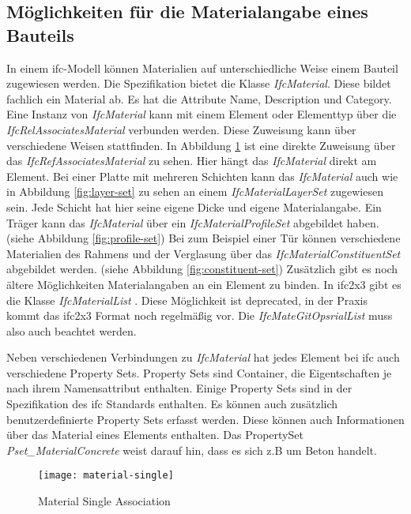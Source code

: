 \subsection{Möglichkeiten für die  Materialangabe eines Bauteils}
\label{c:basics:ifc:buildingmaterial}
In einem \ac{ifc}-Modell können Materialien auf unterschiedliche Weise einem Bauteil zugewiesen werden. Die Spezifikation bietet die Klasse \textit{IfcMaterial}. Diese bildet fachlich ein Material ab. Es hat die Attribute Name, Description und Category.\citep{ifc_material} Eine Instanz von \textit{IfcMaterial} kann mit einem Element oder Elementtyp über die \textit{IfcRelAssociatesMaterial} verbunden werden. Diese Zuweisung kann über verschiedene Weisen stattfinden. In Abbildung \ref{fig:material-single} ist eine direkte Zuweisung über das \textit{IfcRefAssociatesMaterial} zu sehen. Hier hängt das \textit{IfcMaterial} direkt am Element. 
Bei einer Platte mit mehreren Schichten kann das \textit{IfcMaterial} auch wie in Abbildung \ref{fig:layer-set} zu sehen an einem \textit{IfcMaterialLayerSet} zugewiesen sein. Jede Schicht hat hier seine eigene Dicke und eigene Materialangabe. 
Ein Träger kann das \textit{IfcMaterial} über ein \textit{IfcMaterialProfileSet} abgebildet haben. (siehe Abbildung \ref{fig:profile-set})
Bei zum Beispiel einer Tür können verschiedene Materialien des Rahmens und der Verglasung über das \textit{IfcMaterialConstituentSet} abgebildet werden. (siehe Abbildung \ref{fig:constituent-set}) \citep{ifc_material_association}
Zusätzlich gibt es noch ältere Möglichkeiten Materialangaben an ein Element zu binden. In \ac{ifc2x3} gibt es die Klasse \textit{IfcMaterialList} \citep{Thomas2007_MaterialList}. Diese Möglichkeit ist deprecated, in der Praxis kommt das \ac{ifc2x3} Format noch regelmäßig vor. Die \textit{IfcMateGitOpsrialList} muss also auch beachtet werden.

Neben verschiedenen Verbindungen zu \textit{IfcMaterial} hat jedes Element bei \ac{ifc} auch verschiedene Property Sets. Property Sets sind Container, die Eigentschaften je nach ihrem Namensattribut enthalten. Einige Property Sets sind in der Spezifikation des \ac{ifc} Standards enthalten. Es können auch zusätzlich benutzerdefinierte Property Sets erfasst werden. Diese können auch Informationen über das Material eines Elements enthalten. \citep{ifc_property_set} Das PropertySet \textit{Pset\_MaterialConcrete} weist darauf hin, dass es sich z.B um Beton handelt.

\begin{figure}[h]
	\centering
	\texttt{[image: material-single]}
	\caption[IfcMaterial]{Material Single Association}
	\label{fig:material-single}
\end{figure}

